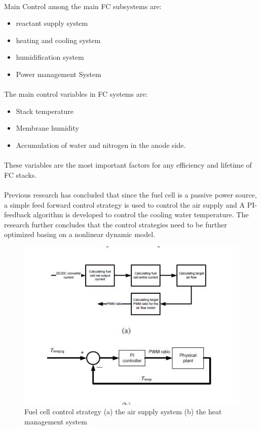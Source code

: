 \paragraph{}Main Control among the main FC subsystems are:
\begin{itemize}
\item reactant supply system
\item heating and cooling system
\item humidification system
\item Power management System
\end{itemize}
\paragraph{}The main control variables in FC systems are: 
\begin{itemize}
\item Stack temperature
\item Membrane humidity
\item Accumulation of water and nitrogen in the anode side. 
\end{itemize}
\paragraph{}These variables are the most important factors for any efficiency and lifetime of FC stacks.
\paragraph{}Previous research has concluded that since the fuel cell is a passive power source, a simple feed forward control strategy is used to control the air supply and A PI-feedback algorithm is developed to control the cooling water temperature. The research further concludes that the control strategies need to be further optimized basing on a nonlinear dynamic model.
\begin{figure}[!h]
\includegraphics{Figures/Figure8}
\caption{Fuel cell control strategy (a) the air supply system (b) the heat management system
\cite{xu_hierarchical_2010}}
\end{figure}

